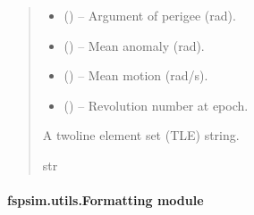 \documentclass[letterpaper,10pt,english]{sphinxmanual}
\begin{document}
\begin{fulllineitems}
\begin{quote}
\begin{description}
\begin{itemize}
\item {} 
\sphinxAtStartPar
{} () – Argument of perigee (rad).

\item {} 
\sphinxAtStartPar
{} () – Mean anomaly (rad).

\item {} 
\sphinxAtStartPar
{} () – Mean motion (rad/s).

\item {} 
\sphinxAtStartPar
{} () – Revolution number at epoch.

\end{itemize}

\sphinxAtStartPar
A two\sphinxhyphen{}line element set (TLE) string.

\sphinxAtStartPar
str

\end{description}\end{quote}

\end{fulllineitems}



\paragraph{fspsim.utils.Formatting module}
\label{\detokenize{fspsim.utils:module-fspsim.utils.Formatting}}\label{\detokenize{fspsim.utils:fspsim-utils-formatting-module}}
\end{document}
